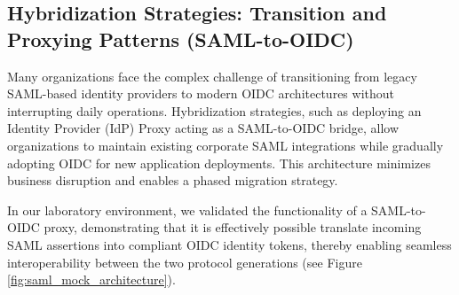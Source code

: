 \documentclass[../memoire.tex]{subfiles}
\begin{document}
\subsection{Hybridization Strategies: Transition and Proxying Patterns (SAML-to-OIDC)}
Many organizations face the complex challenge of transitioning from legacy SAML-based identity providers to modern OIDC architectures without interrupting daily operations. Hybridization strategies, such as deploying an Identity Provider (IdP) Proxy acting as a SAML-to-OIDC bridge, allow organizations to maintain existing corporate SAML integrations while gradually adopting OIDC for new application deployments. This architecture minimizes business disruption and enables a phased migration strategy. 

In our laboratory environment, we validated the functionality of a SAML-to-OIDC proxy, demonstrating that it is effectively possible translate incoming SAML assertions into compliant OIDC identity tokens, thereby enabling seamless interoperability between the two protocol generations (see Figure \ref{fig:saml_mock_architecture}).

\end{document}
